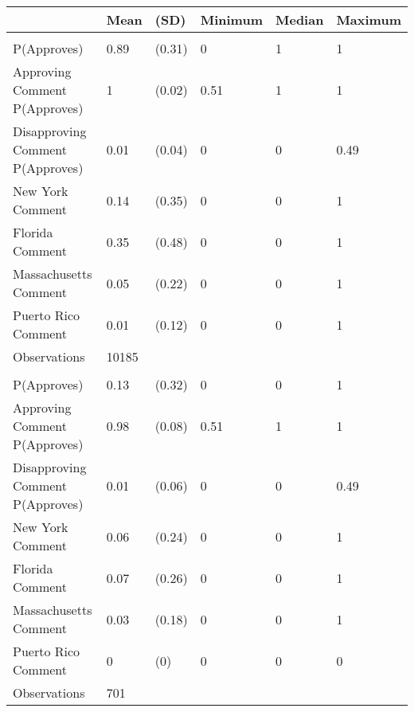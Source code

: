 
\begin{tabular}[t]{llllll}
\toprule
 & Mean & (SD) & Minimum & Median & Maximum\\
\midrule
\addlinespace[0.3em]
\multicolumn{6}{l}{\textbf{All Comments}}\\
\hspace{1em}P(Approves) & 0.89 & (0.31) & 0 & 1 & 1\\
\hspace{1em}Approving Comment P(Approves) & 1 & (0.02) & 0.51 & 1 & 1\\
\hspace{1em}Disapproving Comment P(Approves) & 0.01 & (0.04) & 0 & 0 & 0.49\\
\hspace{1em}New York Comment & 0.14 & (0.35) & 0 & 0 & 1\\
\hspace{1em}Florida Comment & 0.35 & (0.48) & 0 & 0 & 1\\
\hspace{1em}Massachusetts Comment & 0.05 & (0.22) & 0 & 0 & 1\\
\hspace{1em}Puerto Rico Comment & 0.01 & (0.12) & 0 & 0 & 1\\
\midrule
\hspace{1em}Observations & 10185 &  &  &  & \\
\midrule
\addlinespace[0.3em]
\multicolumn{6}{l}{\textbf{Unique Comments}}\\
\hspace{1em}P(Approves) & 0.13 & (0.32) & 0 & 0 & 1\\
\hspace{1em}Approving Comment P(Approves) & 0.98 & (0.08) & 0.51 & 1 & 1\\
\hspace{1em}Disapproving Comment P(Approves) & 0.01 & (0.06) & 0 & 0 & 0.49\\
\hspace{1em}New York Comment & 0.06 & (0.24) & 0 & 0 & 1\\
\hspace{1em}Florida Comment & 0.07 & (0.26) & 0 & 0 & 1\\
\hspace{1em}Massachusetts Comment & 0.03 & (0.18) & 0 & 0 & 1\\
\hspace{1em}Puerto Rico Comment & 0 & (0) & 0 & 0 & 0\\
\midrule
\hspace{1em}Observations & 701 &  &  &  & \\
\midrule
\bottomrule
\end{tabular}
